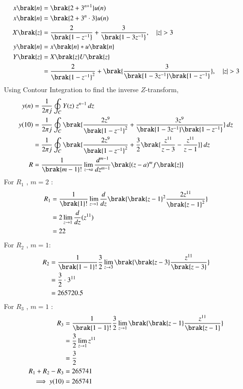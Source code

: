 \documentclass[journal,12pt,twocolumn]{IEEEtran}
\theoremstyle{remark}
\begin{document}
\begin{align}
x\brak{n} &= \brak{2+3^{n+1}}u(n)\\
x\brak{n} &= \brak{2+3^{n}\cdot{3}}u(n)\\
X\brak{z} &= \frac{2}{\brak{1-z^{-1}}}+\frac{3}{\brak{1-3z^{-1}}} , \quad |z|>3\\
y\brak{n} &= x\brak{n}*u\brak{n} \\
Y\brak{z} &= X\brak{z}U\brak{z}\\
&=\frac{2}{\brak{1-z^{-1}}^{2}}+\brak{\frac{3}{\brak{1-3z^{-1}}\brak{1-z^{-1}}}} ,\quad |z|>3
\end{align}
 Using Contour Integration to find the inverse $Z$-transform,
\begin{align}
y(n)&=\frac{1}{2\pi j}\oint_{C}Y(z) \;z^{n-1} \,dz  \\
y(10)&=\frac{1}{2\pi j}\oint_{C}\brak{\frac{2z^{9}}{\brak{1-z^{-1}}^{2}}+\frac{3z^{9}}{\brak{1-3z^{-1}}\brak{1-z^{-1}}}} \, dz\\
&=\frac{1}{2\pi j}\oint_{C}\brak{\frac{2z^{9}}{\brak{1-z^{-1}}^{2}}+\frac{3}{2}\brak{\frac{z^{11}}{z-3}-\frac{z^{11}}{z-1}}} \,dz\\
R &=\frac{1}{\brak {m-1}!}\lim\limits_{z\to a}\frac{d^{m-1}}{dz^{m-1}}\brak {{(z-a)^{m}}f\brak{z}}
\end{align}
For $R_1$ , $m=2$ :
\begin{align}
R_1 &=\frac{1}{\brak {1}!}\lim\limits_{z\to 1}\frac{d}{dz}\brak {{\brak{z-1}^{2}}\frac{2z^{11}}{{\brak{z-1}^2}}}  \\
&=2\lim\limits_{z\to 1}\frac{d}{dz}(z^{11})   \\
&=22
\end{align}
For $R_2$ , $m=1$:
\begin{align}
R_2 &=\frac{1}{\brak {1-1}!}\frac{3}{2}\lim\limits_{z\to 3}\brak{\brak{z-3}\frac{z^{11}}{\brak{z-3}}} \\
&=\frac{3}{2}\cdot{3^{11}}  \\
&=265720.5
\end{align}
For $R_3$ , $m=1$ :
\begin{align}
R_3 &=\frac{1}{\brak {1-1}!}\frac{3}{2}\lim\limits_{z\to 1}\brak{\brak{z-1}\frac{z^{11}}{\brak{z-1}}} \\
&=\frac{3}{2}\lim\limits_{z\to1}z^{11}\\
&=\frac{3}{2}\\
 R_1 + R_2 - R_3 &= 265741\\
    \implies  y{(10)} &= 265741
\end{align}
\end{document}
